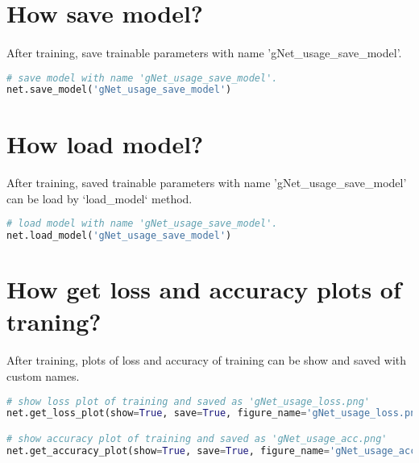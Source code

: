\documentclass[12pt]{report}
\begin{document}
\section{How save model?}
\paragraph{}
After training, save trainable parameters with name 'gNet\_usage\_save\_model'.

\begin{lstlisting}[language=Python, numbers=none, caption={Save model with name'gNet\_usage\_save\_model'.}, label={ex:save-model}]
# save model with name 'gNet_usage_save_model'.
net.save_model('gNet_usage_save_model')
\end{lstlisting}



\section{How load model?}
\paragraph{}
After training, saved trainable parameters with name 'gNet\_usage\_save\_model' can be load by `load\_model` method.

\begin{lstlisting}[language=Python, numbers=none, caption={Load model with name'gNet\_usage\_save\_model'.}, label={ex:load-model}]
# load model with name 'gNet_usage_save_model'.
net.load_model('gNet_usage_save_model')
\end{lstlisting}



\section{How get loss and accuracy plots of traning?}
\paragraph{}
After training, plots of loss and accuracy of training can be show and saved with custom names. 

\begin{lstlisting}[language=Python, numbers=none, caption={Plots of training.}, label={ex:plot-model}]
# show loss plot of training and saved as 'gNet_usage_loss.png'
net.get_loss_plot(show=True, save=True, figure_name='gNet_usage_loss.png')

# show accuracy plot of training and saved as 'gNet_usage_acc.png'
net.get_accuracy_plot(show=True, save=True, figure_name='gNet_usage_acc.png')
\end{lstlisting}
\end{document}
